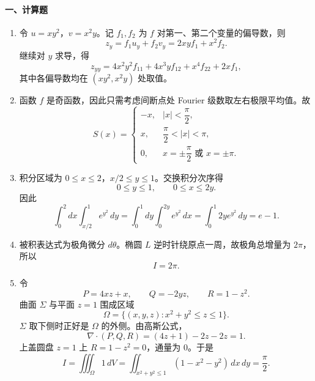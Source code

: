 \paragraph*{一、计算题}
\begin{enumerate}
  \item 令 $u=xy^2$，$v=x^2y$。记 $f_1,f_2$ 为 $f$ 对第一、第二个变量的偏导数，则
  \[
    z_y=f_1u_y+f_2v_y=2xyf_1+x^2f_2.
  \]
  继续对 $y$ 求导，得
  \[
    z_{yy}=4x^2y^2f_{11}+4x^3yf_{12}+x^4f_{22}+2xf_1,
  \]
  其中各偏导数均在 $(xy^2,x^2y)$ 处取值。
  \item 函数 $f$ 是奇函数，因此只需考虑间断点处 Fourier 级数取左右极限平均值。故
  \[
    S(x)=
    \begin{cases}
      -x, & |x|<\dfrac{\pi}{2},\\
      x, & \dfrac{\pi}{2}<|x|<\pi,\\
      0, & x=\pm\dfrac{\pi}{2}\text{ 或 }x=\pm\pi.
    \end{cases}
  \]
  \item 积分区域为 $0\le x\le 2$，$x/2\le y\le 1$。交换积分次序得
  \[
    0\le y\le 1,\qquad 0\le x\le 2y.
  \]
  因此
  \[
    \int_0^2 dx\int_{x/2}^1 e^{y^2}\,dy
    =\int_0^1dy\int_0^{2y}e^{y^2}\,dx
    =\int_0^1 2y e^{y^2}\,dy=e-1.
  \]
  \item 被积表达式为极角微分 $d\theta$。椭圆 $L$ 逆时针绕原点一周，故极角总增量为 $2\pi$，所以
  \[
    I=2\pi.
  \]
  \item 令
  \[
    P=4xz+x,\qquad Q=-2yz,\qquad R=1-z^2.
  \]
  曲面 $\Sigma$ 与平面 $z=1$ 围成区域
  \[
    \Omega=\{(x,y,z):x^2+y^2\le z\le 1\}.
  \]
  $\Sigma$ 取下侧时正好是 $\Omega$ 的外侧。由高斯公式，
  \[
    \nabla\cdot(P,Q,R)=(4z+1)-2z-2z=1.
  \]
  上盖圆盘 $z=1$ 上 $R=1-z^2=0$，通量为 $0$。于是
  \[
    I=\iiint_\Omega 1\,dV
    =\iint_{x^2+y^2\le 1}(1-x^2-y^2)\,dx\,dy
    =\frac{\pi}{2}.
  \]
\end{enumerate}

